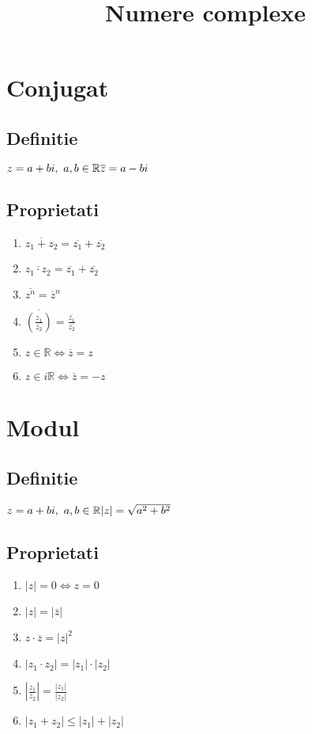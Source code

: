 \documentclass{article}
\title{Numere complexe}
\date{}
\author{}
\begin{document}
\maketitle
\section{Conjugat}

\subsection{Definitie}
$
    z = a+bi,\  a,b \in\mathbb{R}
    \\*
    \overline{z} = a-bi
$

\subsection{Proprietati}
\begin{enumerate}
    \item $ \overline{z_1+z_2} = \overline{z_1} + \overline{z_2}$
    \item $ \overline{z_1\cdot z_2} = \overline{z_1} + \overline{z_2}$
    \item $ \overline{z^n} = \overline{z}^n$
    \item $ \overline{(\frac{z_1}{z_2})} = \frac{\overline{z_1}}{\overline{z_2}}$
    \item $ z \in \mathbb{R} \Leftrightarrow \overline{z}=z$
    \item $ z \in i\mathbb{R} \Leftrightarrow \overline{z}=-z$
\end{enumerate}

\section{Modul}

\subsection{Definitie}
$
    z = a+bi,\  a,b \in \mathbb{R}
    \\*
    |z| = \sqrt{a^2+b^2}
$

\subsection{Proprietati}
\begin{enumerate}
    \item $ |z| = 0 \Leftrightarrow z=0$
    \item $ |z| = |\overline{z}|$
    \item $ z \cdot \overline{z} = |z|^2$
    \item $ |z_1 \cdot z_2| = |z_1| \cdot |z_2|$
    \item $ |\frac{z_1}{z_2}| = \frac{|z_1|}{|z_2|} $
    \item $ |z_1 + z_2| \leq |z_1| + |z_2|$
\end{enumerate}
\end{document}
